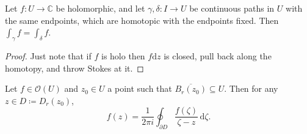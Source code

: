 
\begin{theorem}\label{awooo}
	Let $f : U \to \mathbb{C} $ be holomorphic, and let $\gamma ,\delta : I \to U$ be continuous paths in $U$ with the same endpoints, which are homotopic with the endpoints fixed. Then $\int_\gamma f=\int_\delta f$.
\end{theorem}
\begin{proof}
	Just note that if $f$ is holo then $f\mathrm{d} z$ is closed, pull back along the homotopy, and throw Stokes at it.
\end{proof}
\begin{corollary}\label{awoooo}
	Let $f\in \mathcal{O} (U)$ and $z_0\in U$ a point such that $\overline{B_r(z_0)} \subseteq U$. Then for any $z\in D\coloneqq D_r(z_0)$,
	\[
		f(z) = \frac{1}{2\pi i} \oint_{\partial D} \frac{f(\zeta )}{\zeta -z}  \,\mathrm{d} \zeta 
	.\]
\end{corollary}


